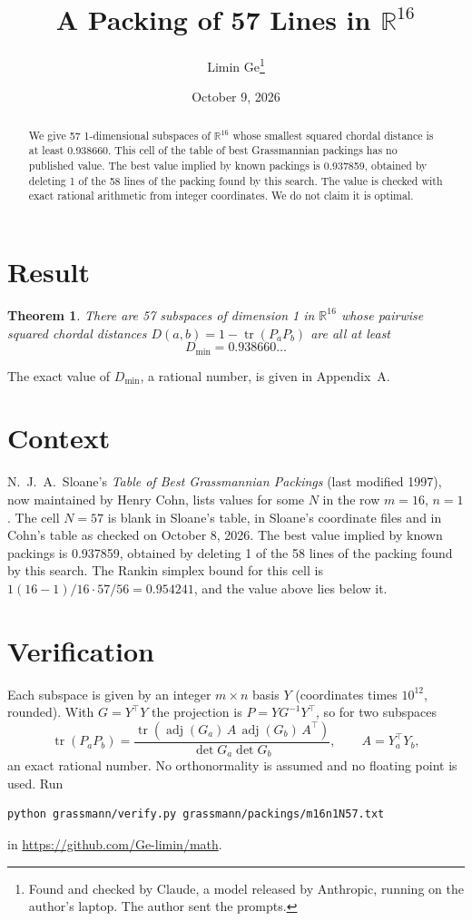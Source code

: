 \documentclass[11pt,a4paper]{article}
\title{A Packing of 57 Lines in $\mathbb{R}^{16}$}
\author{Limin Ge\thanks{Found and checked by Claude, a model released by Anthropic, running on the author's laptop. The author sent the prompts.}}
\date{October 9, 2026}
\newtheorem*{theorem}{Theorem}
\begin{document}
\maketitle
\begin{abstract}
We give 57 1-dimensional subspaces of $\mathbb{R}^{16}$ whose smallest squared chordal distance is at least 0.938660. This cell of the table of best Grassmannian packings has no published value. The best value implied by known packings is 0.937859, obtained by deleting 1 of the 58 lines of the packing found by this search. The value is checked with exact rational arithmetic from integer coordinates. We do not claim it is optimal.
\end{abstract}

\section{Result}
\begin{theorem}
There are 57 subspaces of dimension 1 in $\mathbb{R}^{16}$ whose pairwise squared chordal distances $D(a,b) = 1 - \operatorname{tr}(P_aP_b)$ are all at least
\[ D_{\min} = 0.938660\ldots \]
\end{theorem}
The exact value of $D_{\min}$, a rational number, is given in Appendix~A.


\section{Context}
N.~J.~A.~Sloane's \emph{Table of Best Grassmannian Packings} (last modified 1997), now maintained by Henry Cohn, lists values for some $N$ in the row $m=16$, $n=1$. The cell $N=57$ is blank in Sloane's table, in Sloane's coordinate files and in Cohn's table as checked on October 8, 2026. The best value implied by known packings is 0.937859, obtained by deleting 1 of the 58 lines of the packing found by this search. The Rankin simplex bound for this cell is $1(16-1)/16\cdot 57/56 = 0.954241$, and the value above lies below it.


\section{Verification}
Each subspace is given by an integer $m\times n$ basis $Y$ (coordinates times $10^{12}$, rounded). With $G=Y^\top Y$ the projection is $P=YG^{-1}Y^\top$, so for two subspaces
\[ \operatorname{tr}(P_aP_b)=\frac{\operatorname{tr}(\operatorname{adj}(G_a)\,A\,\operatorname{adj}(G_b)\,A^\top)}{\det G_a\det G_b},\qquad A=Y_a^\top Y_b, \]
an exact rational number. No orthonormality is assumed and no floating point is used. Run
\begin{verbatim}
python grassmann/verify.py grassmann/packings/m16n1N57.txt
\end{verbatim}
in \url{https://github.com/Ge-limin/math}.
\end{document}
